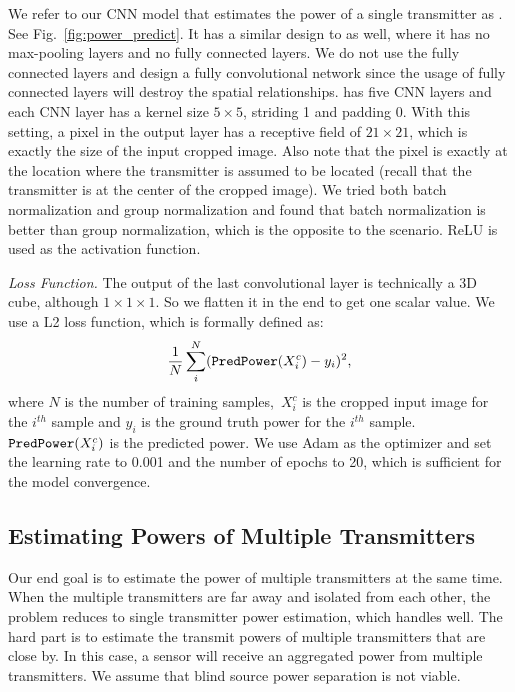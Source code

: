 We refer to our CNN model that estimates the power of a single transmitter as \power.
See Fig.~\ref{fig:power_predict}.
It has a similar design to \imgimg as well, where it has no max-pooling layers and no fully connected layers.
We do not use the fully connected layers and design a fully convolutional network since the usage of fully connected layers will destroy the spatial relationships.
\power has five CNN layers and each CNN layer has a kernel size $5\times5$, striding 1 and padding 0.
With this setting, a pixel in the output layer has a receptive field of $21\times 21$, which is exactly the size of the input cropped image. Also note that the pixel is exactly at the location where the transmitter is assumed to be located (recall that the transmitter is at the center of the cropped image).
We tried both batch normalization and group normalization and found that batch normalization is better than group normalization, which is the opposite to the \imgimg scenario.
ReLU is used as the activation function.

{\em Loss Function.} The output of the last convolutional layer is technically a 3D cube, although $1 \times 1 \times 1$. So we flatten it in the end to get one scalar value.
We use a L2 loss function, which is formally defined as:
\begin{equation}
 \frac{1}{N} \sum_{i}^{N} ({\texttt{PredPower}}(X^c_{i}) - y_i)^2,
\end{equation}
where $N$ is the number of training samples,~$X^c_{i}$ is the cropped input image for the $i^{th}$ sample and $y_i$ is the ground truth power for the $i^{th}$ sample.
${\texttt{PredPower}}(X^c_{i})$ is the predicted power.
We use Adam as the optimizer and set the learning rate to 0.001 and the number of epochs to 20, which is sufficient for the model convergence.

\subsection{Estimating Powers of Multiple Transmitters}
Our end goal is to estimate the power of multiple transmitters at the same time. 
When the multiple transmitters are far away and isolated from each other, the problem reduces to single transmitter power estimation, which \power handles well.
The hard part is to estimate the transmit powers of multiple transmitters that are close by. 
In this case, a sensor will receive an aggregated power from multiple transmitters. We assume that blind source power separation is not viable. 

